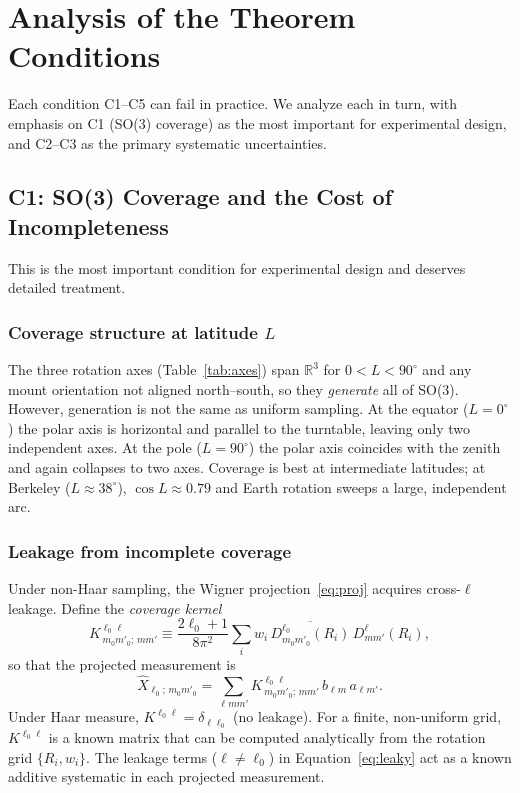 \documentclass{aastex631}
\theoremstyle{plain}
\theoremstyle{remark}
\begin{document}
\section{Analysis of the Theorem Conditions} \label{sec:conditions}

Each condition C1--C5 can fail in practice.
We analyze each in turn, with emphasis on C1 (SO(3) coverage) as the
most important for experimental design, and C2--C3 as the primary
systematic uncertainties.

\subsection{C1: SO(3) Coverage and the Cost of Incompleteness}
\label{sec:so3}

This is the most important condition for experimental design and
deserves detailed treatment.

\subsubsection{Coverage structure at latitude $L$}

The three rotation axes (Table~\ref{tab:axes}) span $\mathbb{R}^3$
for $0 < L < 90^\circ$ and any mount orientation not aligned
north--south, so they \emph{generate} all of SO(3).
However, generation is not the same as uniform sampling.
At the equator ($L=0^\circ$) the polar axis is horizontal and parallel
to the turntable, leaving only two independent axes.
At the pole ($L=90^\circ$) the polar axis coincides with the zenith
and again collapses to two axes.
Coverage is best at intermediate latitudes; at Berkeley
($L\approx38^\circ$), $\cos L \approx 0.79$ and Earth rotation sweeps
a large, independent arc.

\subsubsection{Leakage from incomplete coverage}

Under non-Haar sampling, the Wigner projection~\ref{eq:proj} acquires
cross-$\ell$ leakage.
Define the \emph{coverage kernel}
\begin{equation}
  K^{\ell_0 \ell}_{\,m_0 m'_0;\,m m'}
  \equiv \frac{2\ell_0+1}{8\pi^2}
  \sum_i w_i\,
  \overline{D^{\ell_0}_{m_0 m'_0}(R_i)}\,
  D^\ell_{mm'}(R_i),
\end{equation}
so that the projected measurement is
\begin{equation} \label{eq:leaky}
  \hat{X}_{\ell_0;\,m_0 m'_0}
  = \sum_{\ell mm'} K^{\ell_0\ell}_{\,m_0 m'_0;\,mm'}\,
    b_{\ell m}\, a_{\ell m'}.
\end{equation}
Under Haar measure, $K^{\ell_0\ell} = \delta_{\ell\ell_0}$
(no leakage).
For a finite, non-uniform grid, $K^{\ell_0\ell}$ is a known matrix
that can be computed analytically from the rotation grid
$\{R_i, w_i\}$.
The leakage terms ($\ell \neq \ell_0$) in Equation~\ref{eq:leaky}
act as a known additive systematic in each projected measurement.
\end{document}
